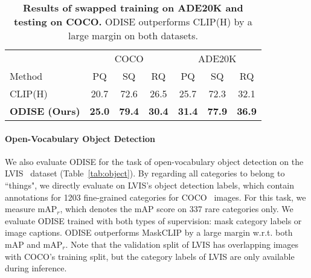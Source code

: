 \documentclass[10pt,twocolumn,letterpaper]{article}
\newcommand{\tablestyle}[2]{\setlength{\tabcolsep}{#1}\renewcommand{\arraystretch}{#2}\centering\small}
\newcommand{\ourmethod}{ODISE}
\begin{document}
\begin{table}[!h]
\tablestyle{6pt}{1.1}
\vspace{-1em}
\begin{tabular}{l|ccc|ccc}
                              & \multicolumn{3}{c|}{COCO}                & \multicolumn{3}{c}{ADE20K}          \\
   Method                    & PQ            & SQ            & RQ            & PQ            & SQ            & RQ            \\
   \shline
   CLIP(H)                   & 20.7          & 72.6          & 26.5          & 25.7          & 72.3          & 32.1          \\
   \textbf{\ourmethod{} (Ours)} & \textbf{25.0} & \textbf{79.4} & \textbf{30.4} & \textbf{31.4} & \textbf{77.9} & \textbf{36.9}
\end{tabular}
\caption{
    \label{tab:swap}
    \textbf{Results of swapped training on ADE20K and testing on COCO.} \ourmethod{} outperforms CLIP(H) by a large margin on both datasets.
}
\vspace{-1em}
\end{table}



\paragraph{Open-Vocabulary Object Detection}
We also evaluate \ourmethod{} for the task of open-vocabulary object detection on the LVIS~\cite{gupta2019lvis} dataset (Table~\ref{tab:object}). By regarding all categories to belong to ``things", we directly evaluate on LVIS's object detection labels, which contain annotations for 1203 fine-grained categories for COCO~\cite{lin2014coco} images. 
For this task, we measure
$\text{mAP}_r$, which denotes the mAP score on 337 rare categories only. 
We evaluate \ourmethod{} trained with both types of supervision: mask category labels or image captions.
\ourmethod{} outperforms MaskCLIP\cite{ding2022open} by a large margin w.r.t. both mAP and $\text{mAP}_r$.
Note that the validation split of LVIS\cite{gupta2019lvis} has overlapping images with COCO\cite{lin2014coco}'s training split, but the category labels of LVIS are only available during inference.
\end{document}
